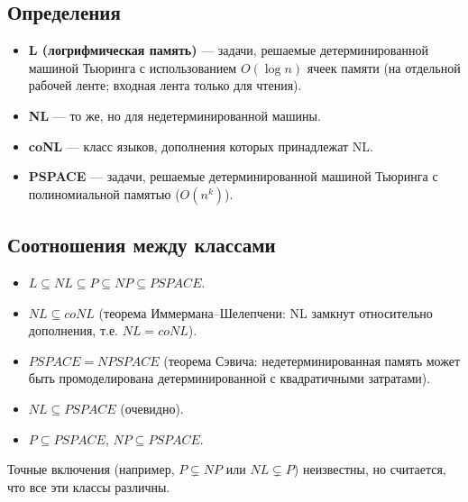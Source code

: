 \documentclass[a4paper,12pt]{article}
\begin{document}
\subsection{Определения}
\begin{itemize}
    \item \textbf{L (логрифмическая память)} --- задачи, решаемые детерминированной машиной Тьюринга с использованием \( O(\log n) \) ячеек памяти (на отдельной рабочей ленте; входная лента только для чтения).
    \item \textbf{NL} --- то же, но для недетерминированной машины.
    \item \textbf{coNL} --- класс языков, дополнения которых принадлежат NL.
    \item \textbf{PSPACE} --- задачи, решаемые детерминированной машиной Тьюринга с полиномиальной памятью (\( O(n^k) \)).
\end{itemize}

\subsection{Соотношения между классами}
\begin{itemize}
    \item \( L \subseteq NL \subseteq P \subseteq NP \subseteq PSPACE \).
    \item \( NL \subseteq coNL \) (теорема Иммермана–Шелепчени: NL замкнут относительно дополнения, т.е. \( NL = coNL \)).
    \item \( PSPACE = NPSPACE \) (теорема Сэвича: недетерминированная память может быть промоделирована детерминированной с квадратичными затратами).
    \item \( NL \subseteq PSPACE \) (очевидно).
    \item \( P \subseteq PSPACE \), \( NP \subseteq PSPACE \).
\end{itemize}
Точные включения (например, \( P \subsetneq NP \) или \( NL \subsetneq P \)) неизвестны, но считается, что все эти классы различны.
\end{document}
